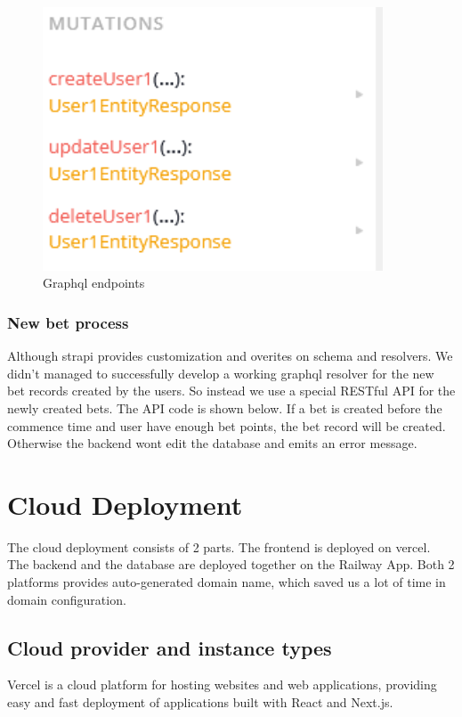 \documentclass[singlecolumn]{article}
\begin{document}
\begin{figure}[H]
\begin{minipage}[c]{0.25\textwidth}
    \end{minipage}%
    \begin{minipage}[c]{0.25\textwidth}
    \centering
    \includegraphics[width=0.9\textwidth]{graphql2.png}
    \end{minipage}%
    \caption{Graphql endpoints}
\end{figure}

\subsubsection{New bet process}

Although strapi provides customization and overites on schema and resolvers. We didn't managed to successfully develop a working graphql resolver for the new bet records created by the users. So instead we use a special RESTful API for the newly created bets. The API code is shown below. If a bet is created before the commence time and user have enough bet points, the bet record will be created. Otherwise the backend wont edit the database and emits an error message.

\section{Cloud Deployment}
The cloud deployment consists of 2 parts. The frontend is deployed on vercel. The backend and the database are deployed together on the Railway App. Both 2 platforms provides auto-generated domain name, which saved us a lot of time in domain configuration.

\subsection{Cloud provider and instance types}
Vercel is a cloud platform for hosting websites and web applications, providing easy and fast deployment of applications built with React and Next.js. 
\end{document}
